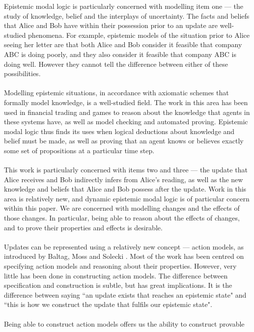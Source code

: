 Epistemic modal logic is particularly concerned with modelling item one --- the study of knowledge,
belief and the interplays of uncertainty.
The facts and beliefs that Alice and Bob have within their possession prior to an update are well-studied phenomena.
For example, epistemic models of the situation prior to Alice seeing her letter are that both Alice
and Bob consider it feasible that company ABC is doing poorly, and they also consider it feasible
that company ABC is doing well.
However they cannot tell the difference between either of these possibilities.\\
\\
Modelling epistemic situations, in accordance with axiomatic schemes that
formally model knowledge, is a well-studied field.
The work in this area has been used in financial trading and games to reason about the knowledge
that agents in these systems have, as well as model checking and automated proving.
Epistemic modal logic thus finds its uses when logical deductions about knowledge and belief must be
made, as well as proving that an agent knows or believes exactly some set of propositions at a
particular time step.\\
\\
This work is particularly concerned with items two and  three --- the update that Alice receives and Bob
indirectly infers from Alice's reading, as well as the new knowledge and beliefs that Alice and Bob
possess after the update.
Work in this area is relatively new, and dynamic epistemic modal logic is of particular concern
within this paper.
We are concerned with modelling changes and the effects of those changes.
In particular, being able to reason about the effects of changes, and to prove their properties and
effects is desirable.\\
\\
Updates can be represented using a relatively new concept --- action models, as
introduced by Baltag, Moss and Solecki \cite{baltag1998lpa}.
Most of the work has been centred on specifying action models and reasoning
about their properties.
However, very little has been done in constructing action models.
The difference between specification and construction is subtle, but has great
implications.
It is the difference between saying ``an update exists that reaches an epistemic
state" and ``this is how we construct the update that fulfils our epistemic state".\\
\\
Being able to construct action models offers us the ability to construct provable 
